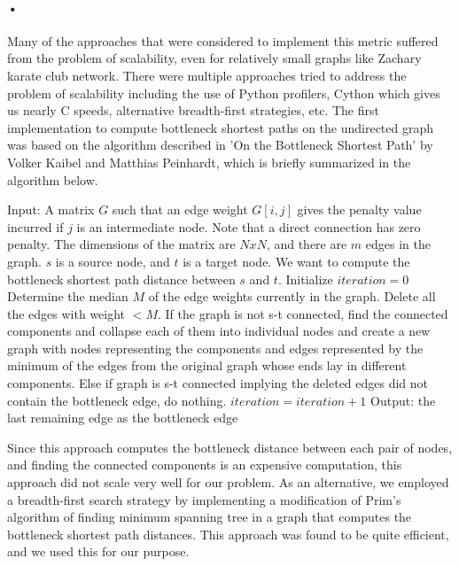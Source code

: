 \documentclass[12pt]{article}
\begin{document}
\paragraph{•}
Many of the approaches that were considered to implement this metric suffered from the problem of scalability, even for relatively small graphs like Zachary karate club network. There were multiple approaches tried to address the problem of scalability including the use of Python profilers, Cython which gives us nearly C speeds, alternative breadth-first strategies, etc. The first implementation to compute bottleneck shortest paths on the undirected graph was based on the algorithm described in 'On the Bottleneck Shortest Path' by Volker Kaibel and Matthias Peinhardt, which is briefly summarized in the algorithm below.

\begin{algorithm}
\begin{algorithmic}
\STATE Input: A matrix $G$ such that an edge weight $G[i,j]$ gives the penalty value incurred if $j$ is an intermediate node. Note that a direct connection has zero penalty. The dimensions of the matrix are $NxN$, and there are $m$ edges in the graph. $s$ is a source node, and $t$ is a target node. We want to compute the bottleneck shortest path distance between $s$ and $t$.
\STATE Initialize $iteration = 0$ 
	\STATE Determine the median $M$ of the edge weights currently in the graph. 
	\STATE Delete all the edges with weight $< M$.
	\STATE If the graph is not s-t connected, find the connected components and collapse each of them into individual nodes and create a new graph with nodes representing the components and edges represented by the minimum of the edges from the original graph whose ends lay in different components.
	\STATE Else if graph is s-t connected implying the deleted edges did not contain the bottleneck edge, do nothing.
	\STATE $iteration = iteration + 1$
\ENDWHILE
\STATE Output: the last remaining edge as the bottleneck edge
\end{algorithmic}
\end{algorithm}
Since this approach computes the bottleneck distance between each pair of nodes, and finding the connected components is an expensive computation, this approach did not scale very well for our problem. As an alternative, we employed a breadth-first search strategy by implementing a modification of Prim's algorithm of finding minimum spanning tree in a graph that computes the bottleneck shortest path distances. This approach was found to be quite efficient, and we used this for our purpose. 
\end{document}
